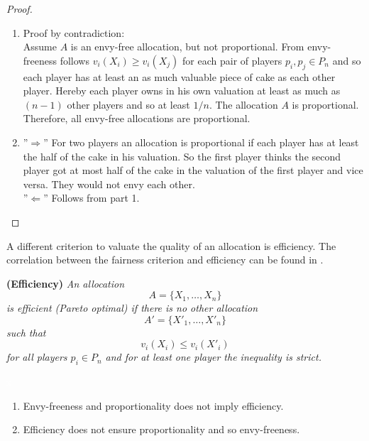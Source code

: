 \begin{proof}
\textcolor{white}{x}
\begin{enumerate}
\item Proof by contradiction:\\ Assume $A$ is an envy-free allocation, but not proportional. From envy-freeness follows $v_i(X_i) \geq v_i(X_j)$ for each pair of players $p_i, p_j \in P_n$ and so each player has at least an as much valuable piece of cake as each other player. Hereby each player owns in his own valuation at least as much as $(n-1)$ other players and so at least $1/n$. \blitza The allocation $A$ is proportional. %
\\Therefore, all envy-free allocations are proportional.
\item ''$\Rightarrow$'' For two players an allocation is proportional if each player has at least the half of the cake in his valuation. So the first player thinks the second player got at most half of the cake in the valuation of the first player and vice versa. They would not envy each other.\\ ''$\Leftarrow$'' Follows from part 1.\\
\end{enumerate}
\end{proof}
A different criterion to valuate the quality of an allocation is efficiency. The correlation between the fairness criterion and efficiency can be found in \cite{eff}. 
\begin{defi}{\textbf{(Efficiency)}}
\newline \emph{An allocation \[A=\{X_1,\dots, X_n\}\] is \emph{efficient (Pareto optimal)} if there is no other allocation \[A'=\{X'_1,\dots, X'_n\}\] such that \[v_i(X_i)\leq v_i(X'_i)\] for all players $p_i \in P_n$ and for at least one player the inequality is strict.}
\end{defi}
%
\begin{lem}
\textcolor{white}{x}
	\begin{enumerate}
		\item Envy-freeness and proportionality does not imply efficiency.
		\item Efficiency does not ensure proportionality and so envy-freeness.
	\end{enumerate}
\end{lem}

